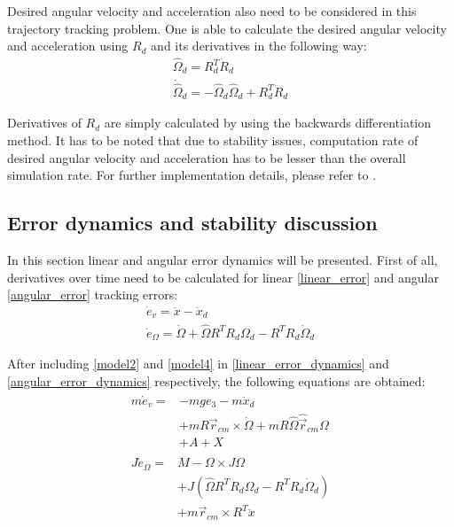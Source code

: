 Desired angular velocity and acceleration also need to be considered in this trajectory tracking problem. One is able to calculate the desired angular velocity and acceleration using $R_d$ and its derivatives in the following way:
\begin{gather}
	\hat{\Omega}_d = R_d^T \dot{R}_d \\
	\dot{\hat{\Omega}}_d = - \hat{\Omega}_d\hat{\Omega}_d + R_d^T \ddot{R}_d
\end{gather}

Derivatives of $R_d$ are simply calculated by using the backwards differentiation method. It has to be noted that due to stability issues, computation rate of desired angular velocity and acceleration has to be lesser than the overall simulation rate. For further implementation details, please refer to \cite{gitLink}.

\subsection{Error dynamics and stability discussion}

In this section linear and angular error dynamics will be presented. First of all, derivatives over time need to be calculated for linear \ref{linear_error} and angular \ref{angular_error} tracking errors:
\begin{gather}
	\dot{e}_v = \ddot{x} - \ddot{x}_d \label{linear_error_dynamics}\\
	\dot{e}_\Omega = \dot{\Omega} + \hat{\Omega}R^TR_d\Omega_d - R^TR_d\dot{\Omega}_d \label{angular_error_dynamics}
\end{gather}

\noindent After including \ref{model2} and \ref{model4} in \ref{linear_error_dynamics} and \ref{angular_error_dynamics} respectively, the following equations are obtained:
\begin{align}
	\label{lin_dynamics_full}
	\begin{split}
		m\dot{e}_v = & - mge_3 - m\ddot{x}_d \\
			&+ mR\vec{r}_{cm}  \times \dot{\Omega} + mR\hat{\Omega}\hat{\vec{r}}_{cm}\Omega \\
			&+ A + X	
	\end{split} \\
	\label{ang_dynamics_full}
	\begin{split}
		J\dot{e}_\Omega = &M - \Omega \times J\Omega \\
			&+ J(\hat{\Omega}R^TR_d\Omega_d - R^TR_d\dot{\Omega}_d) \\
			&+ m\vec{r}_{cm} \times R^T \ddot{x}
	\end{split}
\end{align}

